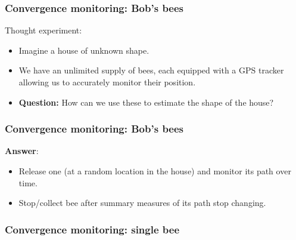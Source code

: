 \documentclass[handout]{beamer}
\begin{document}
\begin{frame}
\frametitle{Convergence monitoring: Bob's bees}
 Thought experiment: 
\begin{itemize}
\item<2-> Imagine a house of unknown shape. 
\item<3-> We have an unlimited supply of bees, each equipped with a GPS tracker allowing us to accurately monitor their position.
\item<4-> \textbf{Question:} How can we use these to estimate the shape of the house?
\end{itemize}


\end{frame}

\begin{frame}
\frametitle{Convergence monitoring: Bob's bees}
\textbf{Answer}: 
\begin{itemize}
\item<2-> Release one (at a random location in the house) and monitor its path over time. 
\item<3-> Stop/collect bee after summary measures of its path stop changing.
\end{itemize}

\end{frame}

\begin{frame}
\frametitle{Convergence monitoring: single bee}

\begin{figure}[t]
\centerline{}
\end{figure}

\end{frame}
\end{document}
